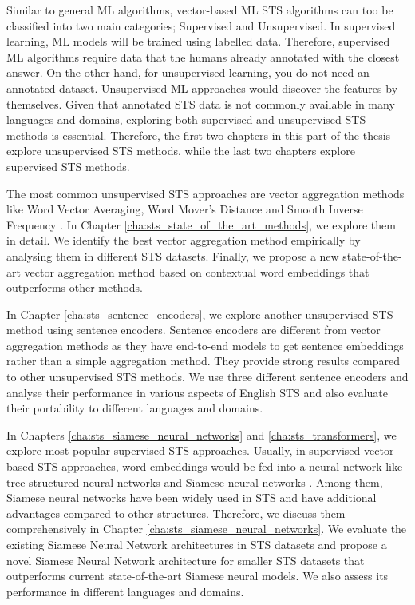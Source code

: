 Similar to general ML algorithms, vector-based ML STS algorithms can too be classified into two main categories; Supervised and Unsupervised. In supervised learning, ML models will be trained using labelled data. Therefore, supervised ML algorithms require data that the humans already annotated with the closest answer. On the other hand, for unsupervised learning, you do not need an annotated dataset. Unsupervised ML approaches would discover the features by themselves. Given that annotated STS data is not commonly available in many languages and domains, exploring both supervised and unsupervised STS methods is essential. Therefore, the first two chapters in this part of the thesis explore unsupervised STS methods, while the last two chapters explore supervised STS methods. 

The most common unsupervised STS approaches are vector aggregation methods like Word Vector Averaging, Word Mover's Distance \autocite{10.5555/3045118.3045221} and Smooth Inverse Frequency \autocite{DBLP:conf/iclr/AroraLM17}. In Chapter \ref{cha:sts_state_of_the_art_methods}, we explore them in detail. We identify the best vector aggregation method empirically by analysing them in different STS datasets. Finally, we propose a new state-of-the-art vector aggregation method based on contextual word embeddings that outperforms other methods. 

In Chapter \ref{cha:sts_sentence_encoders}, we explore another unsupervised STS method using sentence encoders. Sentence encoders are different from vector aggregation methods as they have end-to-end models to get sentence embeddings rather than a simple aggregation method. They provide strong results compared to other unsupervised STS methods. We use three different sentence encoders and analyse their performance in various aspects of English STS and also evaluate their portability to different languages and domains. 


In Chapters \ref{cha:sts_siamese_neural_networks} and \ref{cha:sts_transformers}, we explore most popular supervised STS approaches. Usually, in supervised vector-based STS approaches, word embeddings would be fed into a neural network like tree-structured neural networks \autocite{tai-etal-2015-improved} and Siamese neural networks \autocite{Mueller_Thyagarajan_2016}. Among them, Siamese neural networks have been widely used in STS and have additional advantages compared to other structures. Therefore, we discuss them comprehensively in Chapter \ref{cha:sts_siamese_neural_networks}. We evaluate the existing Siamese Neural Network architectures in STS datasets and propose a novel Siamese Neural Network architecture for smaller STS datasets that outperforms current state-of-the-art Siamese neural models.  We also assess its performance in different languages and domains.

